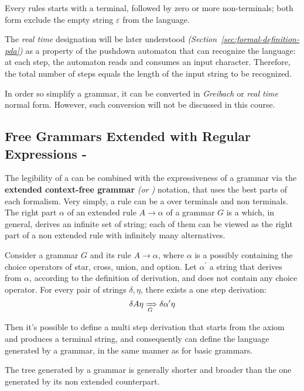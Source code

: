 \documentclass[english]{article}
\begin{document}
Every rules starts with a terminal, followed by zero or more non-terminals;
both form exclude the empty string \(\varepsilon\) from the language.

The \textit{real time} designation will be later understood \textit{(Section~\ref{sec:formal-definition-pda})} as a property of the pushdown automaton that can recognize the language:
at each step, the automaton reads and consumes an input character.
Therefore, the total number of steps equals the length of the input string to be recognized.

In order so simplify a grammar, it can be converted in \textit{Greibach} or \textit{real time} normal form.
However, such conversion will not be discussed in this course.

\subsection{Free Grammars Extended with Regular Expressions - \EBNF}
\label{sec:free-grammars-extended-with-regular-expressions}

The legibility of a \re can be combined with the expressiveness of a grammar via the \textbf{extended context-free grammar} \textit{(or \EBNF)} notation, that uses the best parts of each formalism.
Very simply, a rule \RP can be a \re over terminals and non terminals.
The right part \(\alpha\) of an extended rule \(A \rightarrow \alpha\) of a grammar \(G\) is a \re which, in general, derives an infinite set of string;
each of them can be viewed as the right part of a non extended rule with infinitely many alternatives.

Consider a grammar \(G\) and its rule \(A \rightarrow \alpha\), where \(\alpha\) is a \re possibly containing the choice operators of star, cross, union, and option.
Let \(\alpha^\prime\) a string that derives from \(\alpha\), according to the definition of \re derivation, and does not contain any choice operator.
For every pair of strings \(\delta, \eta\), there exists a one step derivation:
\[ \delta A \eta \xRightarrow[G]{} \delta \alpha^\prime \eta \]

Then it's possible to define a multi step derivation that starts from the axiom and produces a terminal string, and consequently can define the language generated by a \EBNF grammar, in the same manner as for basic grammars.

The tree generated by a \EBNF grammar is generally shorter and broader than the one generated by its non extended counterpart.
\end{document}
